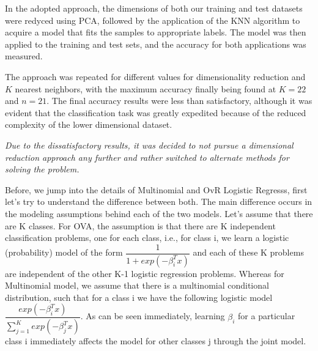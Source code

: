 \documentclass[journal]{IEEEtran}
\begin{document}
In the adopted approach, the dimensions of both our training and test datasets were redyced using PCA, followed by the application of the KNN algorithm to acquire a model that fits the samples to appropriate labels. The model was then applied to the training and test sets, and the accuracy for both applications was measured. \par

The approach was repeated for different values for dimensionality reduction and $K$ nearest neighbors, with the maximum accuracy finally being found at $K = 22$ and $n = 21$. The final accuracy results were less than satisfactory, although it was evident that the classification task was greatly expedited because of the reduced complexity of the lower dimensional dataset. \par

\textit{Due to the dissatisfactory results, it was decided to not pursue a dimensional reduction approach any further and rather switched to alternate methods for solving the problem.} \par

Before, we jump into the details of Multinomial and OvR Logistic Regresss, first let's try to understand the difference between both. The main difference occurs in the modeling assumptions behind each of the two models. Let's assume that there are K classes. For OVA, the assumption is that there are K independent classification problems, one for each class, i.e., for class i, we learn a logistic (probability) model of the form $\dfrac{1}{1+exp(-\beta_{i}^Tx)}$ and each of these K problems are independent of the other K-1 logistic regression problems. Whereas for Multinomial model, we assume that there is a multinomial conditional distribution,  such that for a class i we have the following logistic model $\dfrac{exp(-\beta_{i}^Tx)}{\sum_{j=1}^{K}exp(-\beta_{j}^Tx)}$. As can be seen immediately, learning $\beta_i$ for a particular class i immediately affects the model for other classes j through the joint model.\\
\end{document}
